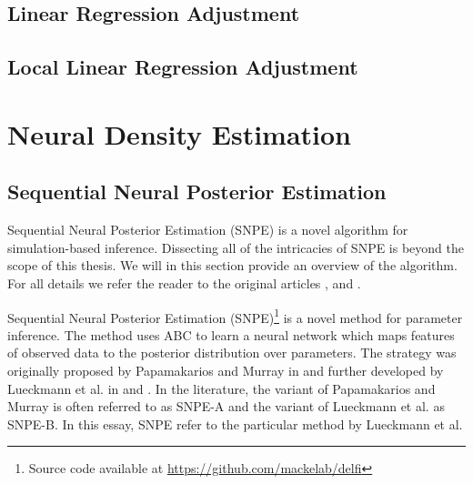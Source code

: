 \subsection{Linear Regression Adjustment}



\subsection{Local Linear Regression Adjustment}



\section{Neural Density Estimation}


\subsection{Sequential Neural Posterior Estimation}

Sequential Neural Posterior Estimation (SNPE) is a novel algorithm for simulation-based inference. Dissecting all of the intricacies of SNPE is beyond the scope of this thesis. We will in this section provide an overview of the algorithm. For all details we refer the reader to the original articles \cite{SNL_first}, \cite{SNPE_first} and \cite{SNPE_apt}.

Sequential Neural Posterior Estimation (SNPE)\footnote{Source code available at \url{https://github.com/mackelab/delfi}} is a novel method for parameter inference. The method uses ABC to learn a neural network which maps features of observed data to the posterior distribution over parameters. The strategy was originally proposed by Papamakarios and Murray in \cite{papamakarios2016fast} and further developed by Lueckmann et al. in \cite{SNPE17} and \cite{SNPE19}. In the literature, the variant of Papamakarios and Murray is often referred to as SNPE-A and the variant of Lueckmann et al. as SNPE-B. In this essay, SNPE refer to the particular method by Lueckmann et al.

